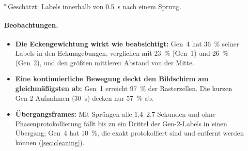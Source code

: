 \documentclass[
  11pt,
  a4paper,
  oneside,
  DIV=12,
  BCOR=8mm,
  parskip=half,
  headings=normal,
  bibliography=totoc,
  listof=totoc
]{scrreprt}
\begin{document}
\begin{table}[htbp]
  \centering
  \caption{Räumliche Abdeckung und Übergangsframes pro Gestaltung
           (Mittelwert über die Sitzungen jeder Generation). Zellen: Anteil
           der 100 Zellen eines $10\times10$-Bildschirmrasters, die mindestens
           ein Label enthalten; Abst.: mittlerer Abstand der Ziele von der
           Bildschirmmitte (normierte Einheiten).}
  \label{tab:design}
  \small
  \setlength{\tabcolsep}{4pt}
  \\[1mm]
  \parbox{0.95\linewidth}{\footnotesize \textsuperscript{a}\,Geschätzt:
  Labels innerhalb von \SI{0,5}{\second} nach einem Sprung.}
\end{table}

\paragraph{Beobachtungen.}
\begin{itemize}[nosep]
  \item \textbf{Die Eckengewichtung wirkt wie beabsichtigt:} Gen~4 hat
        \SI{36}{\percent} seiner Labels in den Eckumgebungen, verglichen mit
        \SI{23}{\percent} (Gen~1) und \SI{26}{\percent} (Gen~2), und den
        größten mittleren Abstand von der Mitte.
  \item \textbf{Eine kontinuierliche Bewegung deckt den Bildschirm am
        gleichmäßigsten ab:} Gen~1 erreicht \SI{97}{\percent} der
        Rasterzellen. Die kurzen Gen-2-Aufnahmen (\SI{30}{\second}) decken nur
        \SI{57}{\percent} ab.
  \item \textbf{Übergangsframes:} Mit Sprüngen alle 1,4--2,7 Sekunden und
        ohne Phasenprotokollierung fällt bis zu ein Drittel der Gen-2-Labels in
        einen Übergang; Gen~4 hat \SI{10}{\percent}, die exakt protokolliert
        sind und entfernt werden können (\cref{sec:cleaning}).
\end{itemize}
\end{document}
